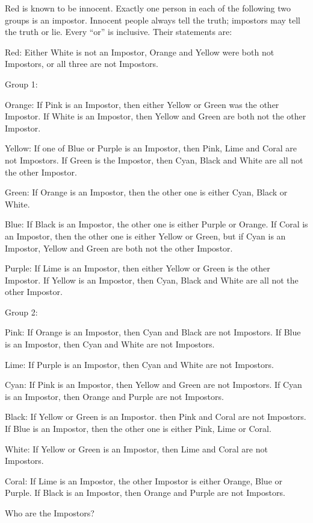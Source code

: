 Red is known to be innocent. Exactly one person in each of the following two groups is an impostor. Innocent people always tell the truth; impostors may tell the truth or lie. Every ``or'' is inclusive. Their statements are:



Red: Either White is not an Impostor, Orange and Yellow were both not Impostors, or all three are not Impostors.



Group 1:



Orange: If Pink is an Impostor, then either Yellow or Green was the other Impostor. If White is an Impostor, then Yellow and Green are both not the other Impostor.



Yellow: If one of Blue or Purple is an Impostor, then Pink, Lime and Coral are not Impostors. If Green is the Impostor, then Cyan, Black and White are all not the other Impostor.



Green: If Orange is an Impostor, then the other one is either Cyan, Black or White.



Blue: If Black is an Impostor, the other one is either Purple or Orange. If Coral is an Impostor, then the other one is either Yellow or Green, but if Cyan is an Impostor, Yellow and Green are both not the other Impostor.



Purple: If Lime is an Impostor, then either Yellow or Green is the other Impostor. If Yellow is an Impostor, then Cyan, Black and White are all not the other Impostor.



Group 2:



Pink: If Orange is an Impostor, then Cyan and Black are not Impostors. If Blue is an Impostor, then Cyan and White are not Impostors.



Lime: If Purple is an Impostor, then Cyan and White are not Impostors.



Cyan: If Pink is an Impostor, then Yellow and Green are not Impostors. If Cyan is an Impostor, then Orange and Purple are not Impostors.



Black: If Yellow or Green is an Impostor. then Pink and Coral are not Impostors. If Blue is an Impostor, then the other one is either Pink, Lime or Coral.



White: If Yellow or Green is an Impostor, then Lime and Coral are not Impostors.



Coral: If Lime is an Impostor, the other Impostor is either Orange, Blue or Purple. If Black is an Impostor, then Orange and Purple are not Impostors.



Who are the Impostors?
